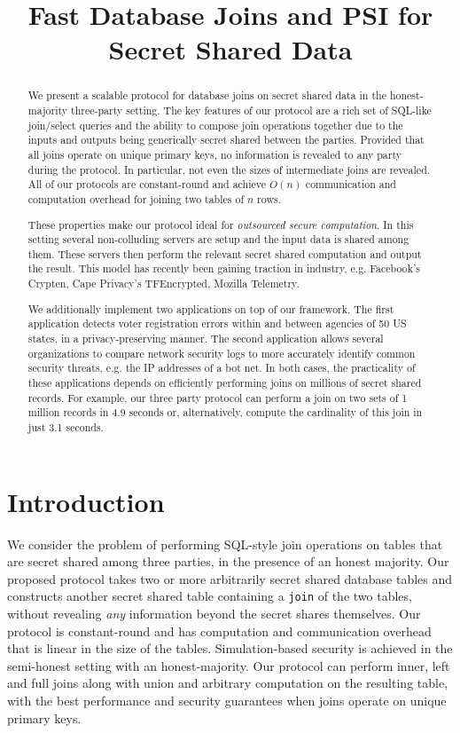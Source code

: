 \documentclass[11pt,letterpaper]{article}
\begin{document}
\title{Fast Database Joins and PSI for Secret Shared Data}
\begin{abstract}
We present a scalable protocol for database joins on secret shared data in the honest-majority three-party setting. The key features of our protocol are a rich set of SQL-like join/select queries and the ability to compose join operations together due to the inputs and outputs being generically secret shared between the parties. Provided that all joins operate on unique primary keys, no information is revealed to any party during the protocol. In particular, not even the sizes of intermediate joins are revealed. All of our protocols are constant-round and achieve $O(n)$ communication and computation overhead for joining two tables of $n$ rows. 

These properties make our protocol ideal for \emph{outsourced secure computation}. In this setting several non-colluding servers are setup and the input data is shared among them. These servers then perform the relevant secret shared computation and output the result. This model has recently been gaining traction in industry, e.g. Facebook's Crypten, Cape Privacy's TFEncrypted, Mozilla Telemetry.

We additionally implement two applications on top of our framework. The first application detects voter registration errors within and between agencies of 50 US states, in a privacy-preserving manner. The second application allows several organizations to compare network security logs to more accurately identify common security threats, e.g. the IP addresses of a bot net. In both cases, the practicality of these applications depends on efficiently performing joins on millions of secret shared records. For example, our three party protocol can perform a join on two sets of 1 million records in 4.9 seconds or, alternatively, compute the cardinality of this join in just 3.1 seconds. 
\end{abstract}

\iffullversion
\else
\maketitle
\fi

\section{Introduction}

We consider the problem of performing SQL-style join operations on tables that are secret shared among three parties, in the presence of an honest majority. Our proposed protocol takes two or more arbitrarily secret shared database tables and constructs another secret shared table containing a \texttt{join} of the two tables, without revealing \emph{any} information beyond the secret shares themselves. Our protocol is constant-round and  has computation and communication overhead that is linear in the size of the tables. Simulation-based security is achieved in the semi-honest setting with an honest-majority. Our protocol can perform inner, left and full joins along with union and arbitrary computation on the resulting table, with the best performance and security guarantees when joins operate on unique primary keys.
\end{document}
